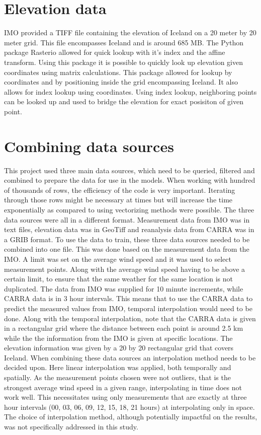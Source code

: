 \section{Elevation data}
IMO provided a TIFF file containing the elevation of Iceland on a 20 meter by 20 meter grid. This file encompasses Iceland and is around 685 MB. The Python package Rasterio allowed for quick lookup with it's index and the affine transform. Using this package it is possible to quickly look up elevation given coordinates using matrix calculations. This package allowed for lookup by coordinates and by positioning inside the grid encompassing Iceland. It also allows for index lookup using coordinates. Using index lookup, neighboring points can be looked up and used to bridge the elevation for exact posisiton of given point.

\label{Chapter3} 
\section{Combining data sources}

This project used three main data sources, which need to be queried, filtered and combined to prepare the data for use in the models. When working with hundred of thousands of rows, the efficiency of the code is very important. Iterating through those rows might be necessary at times but will increase the time exponentially as compared to using vectorizing methods were possible. The three data sources were all in a different format. Measurement data from IMO was in text files, elevation data was in GeoTiff and reanalysis data from CARRA was in a GRIB format. To use the data to train, these three data sources needed to be combined into one file. This was done based on the measurement data from the IMO. A limit was set on the average wind speed and it was used to select measurement points. Along with the average wind speed having to be above a certain limit, to ensure that the same weather for the same location is not duplicated. The data from IMO was supplied for 10 minute increments, while CARRA data is in 3 hour intervals. This means that to use the CARRA data to predict the measured values from IMO, temporal interpolation would need to be done. Along with the temporal interpolation, note that the CARRA data is given in a rectangular grid where the distance between each point is around 2.5 km while the the information from the IMO is given at specific locations. The elevation information was given by a 20 by 20 rectangular grid that covers Iceland. When combining these data sources an interpolation method needs to be decided upon. Here linear interpolation was applied, both temporally and spatially. As the measurement points chosen were not outliers, that is the strongest average wind speed in a given range, interpolating in time does not work well. This necessitates using only measurements that are exactly at three hour intervals (00, 03, 06, 09, 12, 15, 18, 21 hours) at interpolating only in space. The choice of interpolation method, although potentially impactful on the results, was not specifically addressed in this study.

